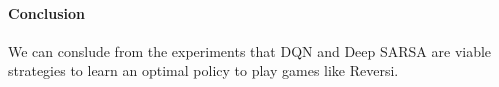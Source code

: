 \paragraph{Conclusion}
We can conslude from  the experiments that DQN and Deep SARSA are viable strategies to learn an optimal policy to play games like Reversi.